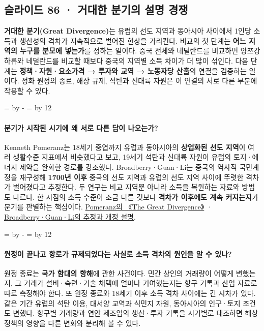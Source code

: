 \documentclass[10pt,a4paper]{article}
\newcommand{\ReserveQuestionSpace}{%
  \par\begingroup
  \dimen0=\pagegoal \advance\dimen0 by -\pagetotal
  \dimen2=\baselineskip \multiply\dimen2 by 12
  \ifdim\dimen0<\dimen2 \newpage\fi
  \endgroup}
\begin{document}
\subsection{슬라이드 86 · 거대한 분기의 설명 경쟁}
\textbf{거대한 분기(Great Divergence)}는 유럽의 선도 지역과 동아시아 사이에서 1인당 소득과 생산성의 격차가 지속적으로 벌어진 현상을 가리킨다. 비교의 첫 단계는 \textbf{어느 지역의 누구를 분모에 넣는가}를 정하는 일이다. 중국 전체와 네덜란드를 비교하면 양쯔강 하류와 네덜란드를 비교할 때보다 중국의 지역별 소득 차이가 더 많이 섞인다. 다음 단계는 \textbf{정책·자원·요소가격 → 투자와 교역 → 노동자당 산출}의 연결을 검증하는 일이다. 정화 원정의 종료, 해상 규제, 석탄과 신대륙 자원은 이 연결의 서로 다른 부분에 작용할 수 있다.\par

\ReserveQuestionSpace
\paragraph{분기가 시작된 시기에 왜 서로 다른 답이 나오는가?}
Kenneth Pomeranz는 18세기 중엽까지 유럽과 동아시아의 \textbf{상업화된 선도 지역}이 여러 생활수준 지표에서 비슷했다고 보고, 19세기 석탄과 신대륙 자원이 유럽의 토지·에너지 제약을 완화한 경로를 강조했다. Broadberry·Guan·Li는 중국의 역사적 국민계정을 재구성해 \textbf{1700년 이후} 중국의 선도 지역과 유럽의 선도 지역 사이에 뚜렷한 격차가 벌어졌다고 추정한다. 두 연구는 비교 지역뿐 아니라 소득을 복원하는 자료와 방법도 다르다. 한 시점의 소득 수준이 조금 다른 것보다 \textbf{격차가 이후에도 계속 커지는지}가 분기를 판별하는 핵심이다. \href{https://www.jstor.org/stable/j.ctv161f3dr}{Pomeranz의 《The Great Divergence》} · \href{https://www.cambridge.org/core/journals/journal-of-economic-history/article/china-europe-and-the-great-divergence-a-restatement/CFE6E6B70578ECF5BD22A17617FC73C8}{Broadberry·Guan·Li의 추정과 개정 설명}.\par

\ReserveQuestionSpace
\paragraph{원정이 끝나고 항로가 규제되었다는 사실로 소득 격차의 원인을 알 수 있나?}
원정 종료는 \textbf{국가 함대의 항해}에 관한 사건이다. 민간 상인의 거래량이 어떻게 변했는지, 그 거래가 설비·숙련·기술 채택에 얼마나 기여했는지는 항구 기록과 산업 자료로 따로 측정해야 한다. 또 원정 종료와 18세기 이후 소득 격차 사이에는 긴 시차가 있다. 같은 기간 유럽의 석탄 이용, 대서양 교역과 식민지 자원, 동아시아의 인구·토지 조건도 변했다. 항구별 거래량과 연안 제조업의 생산·투자 기록을 시기별로 대조하면 해상 정책의 영향을 다른 변화와 분리해 볼 수 있다.\par
\end{document}
